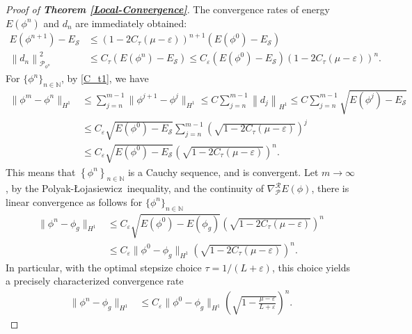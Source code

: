 \documentclass[preprint,3p]{elsarticle}
\begin{document}
\begin{proof}[Proof of {\bf Theorem \ref{Local-Convergence}}]
	The convergence rates of energy $E(\phi^n)$ and $d_n$ are immediately obtained:
	\begin{align*}
		E(\phi^{n+1})-E_{\mathcal{S}}&\le\left(1-2C_{\tau}(\mu-\varepsilon)\right)^{n+1}\left(E(\phi^{0})-E_{\mathcal{S}}\right)\\
		\left\|d_n\right\|^2_{\mathcal{P}_{\phi^n}}&\le C_{\tau}\left(E(\phi^{n})-E_{\mathcal{S}}\right)\le C_{\varepsilon}\left(E(\phi^{0})-E_{\mathcal{S}}\right)\left(1-2C_{\tau}(\mu-\varepsilon)\right)^{n}.
	\end{align*}
	For $\big\{\phi^n\big\}_{n\in\mathbb{N}}$, by \eqref{C_t1}, we have
	\begin{align}\label{Phi-eq-Grad}
		\nonumber\|\phi^{m}-\phi^n\|_{H^1}&\le\sum\limits_{j=n}^{m-1}\|\phi^{j+1}-\phi^j\|_{H^1}\le C\sum\limits_{j=n}^{m-1}\left\|d_j\right\|_{H^1}\le C\sum\limits_{j=n}^{m-1}\sqrt{E(\phi^{j})-E_{\mathcal{S}}}\\
		\nonumber&\le  C_{\varepsilon}\sqrt{E(\phi^{0})-E_{\mathcal{S}}}\sum\limits_{j=n}^{m-1}\left(\sqrt{1-2C_{\tau}(\mu-\varepsilon)}\right)^{j}\\
		&\le C_{\varepsilon}\sqrt{E(\phi^{0})-E_{\mathcal{S}}}\left(\sqrt{1-2C_{\tau}(\mu-\varepsilon)}\right)^{n}.
	\end{align}
	This means that $\left\{\phi^n\right\}_{n\in\mathbb{N}}$ is a Cauchy sequence, and is convergent. Let $m\to\infty$, by the Polyak-\L ojasiewicz\ inequality, and the continuity of $\nabla^{\mathcal{R}}_{\mathcal{P}} E(\phi)$, there is linear convergence as follows for $\big\{\phi^n\big\}_{n\in\mathbb{N}}$
	\begin{align*}
		\|\phi^n-\phi_g\|_{H^1}&\le C_{\varepsilon}\sqrt{E(\phi^{0})-E(\phi_g)}\left(\sqrt{1-2C_{\tau}(\mu-\varepsilon)}\right)^{n}\\
		&\le C_{\varepsilon}\|\phi^0-\phi_g\|_{H^1}\left(\sqrt{1-2C_{\tau}(\mu-\varepsilon)}\right)^{n}.
	\end{align*}
	In particular, with the optimal stepsize choice $\tau=1/(L+\varepsilon)$, this choice yields a precisely characterized convergence rate
	\begin{align*}
		\|\phi^n-\phi_g\|_{H^1}&\le C_{\varepsilon}\|\phi^0-\phi_g\|_{H^1}\left(\sqrt{1-\frac{\mu-\varepsilon}{L+\varepsilon}}\right)^{n}.
	\end{align*}
\end{proof}
\end{document}
